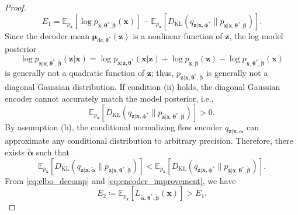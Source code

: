 \documentclass[10pt,a4paper]{amsart}
\newcommand{\mb}{\boldsymbol}
\begin{document}
\begin{proof}
\begin{equation}
E_1 = \mathbb{E}_{p_{\mb{x}}}[\log p_{\mb{x},\mb{\theta}^*,\tilde{\mb{\beta}}}(\mb{x})]
- \mathbb{E}_{p_{\mb{x}}}[D_{\mathrm{KL}}(q_{\mb{z}|\mb{x},\mb{\phi}^*} \| p_{\mb{z}|\mb{x},\mb{\theta}^*,\tilde{\mb{\beta}}})].
\end{equation}
Since the decoder mean $\mb{\mu}_{\mathrm{de},\mb{\theta}^*}(\mb{z})$ is a nonlinear function of $\mb{z}$, the log model posterior
$$
\log p_{\mb{z}|\mb{x},\mb{\theta}^*,\tilde{\mb{\beta}}}(\mb{z}|\mb{x})
= \log p_{\mb{x}|\mb{z},\mb{\theta}^*}(\mb{x}|\mb{z}) + \log p_{\mb{z},\tilde{\mb{\beta}}}(\mb{z}) - \log p_{\mb{x},\mb{\theta}^*,\tilde{\mb{\beta}}}(\mb{x})
$$
is generally not a quadratic function of $\mb{z}$; thus, $p_{\mb{z}|\mb{x},\mb{\theta}^*,\tilde{\mb{\beta}}}$ is generally not a diagonal Gaussian distribution. If condition (ii) holds, the diagonal Gaussian encoder cannot accurately match the model posterior, i.e.,
\begin{equation}
\mathbb{E}_{p_{\mb{x}}}[D_{\mathrm{KL}}(q_{\mb{z}|\mb{x},\mb{\phi}^*} \| p_{\mb{z}|\mb{x},\mb{\theta}^*,\tilde{\mb{\beta}}})] > 0.
\label{eq:gauss_gap}
\end{equation}
By assumption (b), the conditional normalizing flow encoder $q_{\mb{z}|\mb{x},\mb{\alpha}}$ can approximate any conditional distribution to arbitrary precision. Therefore, there exists $\tilde{\mb{\alpha}}$ such that
\begin{equation}
\mathbb{E}_{p_{\mb{x}}}[D_{\mathrm{KL}}(q_{\mb{z}|\mb{x},\tilde{\mb{\alpha}}} \| p_{\mb{z}|\mb{x},\mb{\theta}^*,\tilde{\mb{\beta}}})]
< \mathbb{E}_{p_{\mb{x}}}[D_{\mathrm{KL}}(q_{\mb{z}|\mb{x},\mb{\phi}^*} \| p_{\mb{z}|\mb{x},\mb{\theta}^*,\tilde{\mb{\beta}}})].
\label{eq:encoder_improvement}
\end{equation}
From \eqref{eq:elbo_decomp} and \eqref{eq:encoder_improvement}, we have
\begin{equation}
E_2 \coloneqq \mathbb{E}_{p_{\mb{x}}}[L_{\tilde{\mb{\alpha}},\mb{\theta}^*,\tilde{\mb{\beta}}}(\mb{x})] > E_1.
\label{eq:E2_gt_E1}
\end{equation}


\end{proof}
\end{document}
